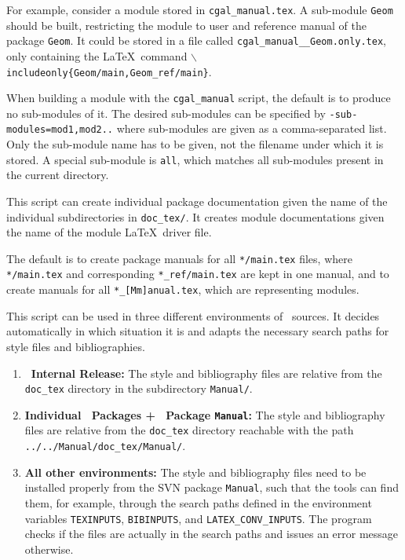 \begin{description}
     For example, consider a module stored in \texttt{cgal\_manual.tex}. A
     sub-module \texttt{Geom} should be built, restricting the module to user
     and reference manual of the package \texttt{Geom}. It could be stored in
     a file called \texttt{cgal\_manual\_\_Geom.only.tex}, only containing the
     \LaTeX\ command
     \texttt{$\backslash$includeonly\{Geom/main,Geom\_ref/main\}}.

     When building a module with the \texttt{cgal\_manual} script, the
     default is to produce no sub-modules of it. The desired sub-modules
     can be specified by \texttt{-sub-modules=mod1,mod2..} where sub-modules
     are given as a comma-separated list. Only the sub-module name has to be
     given, not the filename under which it is stored. A special sub-module
     is \texttt{all}, which matches all sub-modules present in the current
     directory.
\end{description}

 This script can create individual package documentation given the name of
 the individual subdirectories in \texttt{doc\_tex/}. It creates module
 documentations given the name of the module \LaTeX\ driver file.

 The default is to create package manuals for all \texttt{*/main.tex} files,
 where \texttt{*/main.tex} and corresponding \texttt{*\_ref/main.tex}
 are kept in one manual, and to create manuals for all
 \texttt{*\_[Mm]anual.tex}, which are representing modules.

 This script can be used in three different environments of \cgal\ sources.
 It decides automatically in which situation it is and adapts the necessary
 search paths for style files and bibliographies.

\begin{enumerate}
  \item \textbf{\cgal\ Internal Release:}
     The style and bibliography files are relative from the
     \texttt{doc\_tex} directory  in the subdirectory
     \texttt{Manual/}.

  \item \textbf{Individual \cgal\ Packages + \cgal\ Package \texttt{Manual}:}
     The style and bibliography files are  relative from the
     \texttt{doc\_tex} directory reachable with the path
     \texttt{../../Manual/doc\_tex/Manual/}.

   \item \textbf{All other environments:}
     The style and bibliography files need to be installed properly
     from the SVN package \texttt{Manual}, such that the tools can
     find them, for example, through the search paths defined in the
     environment variables  \texttt{TEXINPUTS}, \texttt{BIBINPUTS},
     and \texttt{LATEX\_CONV\_INPUTS}. The program checks if the files
     are actually in the search paths and issues an error message otherwise.
\end{enumerate}

